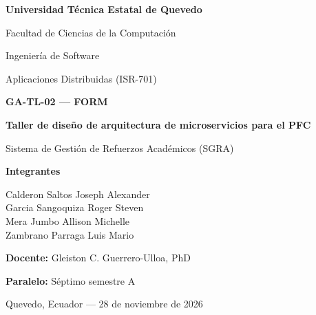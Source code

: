 \begin{titlepage}
\centering
{\Large\bfseries Universidad Técnica Estatal de Quevedo\par}
\vspace{0.5cm}
{\large Facultad de Ciencias de la Computación\par}
{\large Ingeniería de Software\par}
\vfill
{\large Aplicaciones Distribuidas (ISR-701)\par}
\vspace{0.6cm}
{\Large\bfseries GA-TL-02 — FORM\par}
\vspace{0.4cm}
{\LARGE\bfseries Taller de diseño de arquitectura de microservicios para el PFC\par}
\vspace{0.5cm}
{\large Sistema de Gestión de Refuerzos Académicos (SGRA)\par}
\vfill
\textbf{Integrantes}\par
Calderon Saltos Joseph Alexander\\
Garcia Sangoquiza Roger Steven\\
Mera Jumbo Allison Michelle\\
Zambrano Parraga Luis Mario\par
\vspace{0.5cm}
\textbf{Docente:} Gleiston C. Guerrero-Ulloa, PhD\par
\textbf{Paralelo:} Séptimo semestre A\par
\vfill
Quevedo, Ecuador --- 28 de noviembre de 2026
\end{titlepage}
